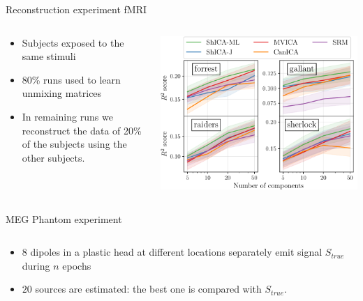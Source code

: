\documentclass[final]{beamer}
\newlength{\onecolwid}
\newlength{\onecolwidthree}
\begin{document}
\begin{frame}[t]
\begin{columns}[t]
\begin{column}{\onecolwidthree}
    \begin{block}{Reconstruction experiment fMRI}
      \begin{columns}
        \begin{column}{0.4 \textwidth}
          \begin{itemize}
          \item Subjects exposed to the same stimuli
          \item 80\% runs used to learn unmixing matrices
          \item In remaining runs we reconstruct the data of 20\% of the
            subjects using the other subjects.
          \end{itemize}
      \end{column}
      \begin{column}{0.6 \textwidth}
          \begin{center}
            \includegraphics[width=\textwidth]{./figures/reconstruction.pdf}
          \end{center}
      \end{column}
      \end{columns}
    \end{block}

    \begin{block}{MEG Phantom experiment}
      \begin{columns}

        \begin{column}{0.4 \textwidth}
          \begin{itemize}
            \item 8 dipoles in a plastic head at different locations separately
              emit signal $S_{true}$ during $n$ epochs
            \item $20$ sources are estimated: the best one is compared with $S_{true}$.
          \end{itemize}
    \end{column}


\end{columns}
\end{block}
\end{column}
\end{columns}
\end{frame}
\end{document}
